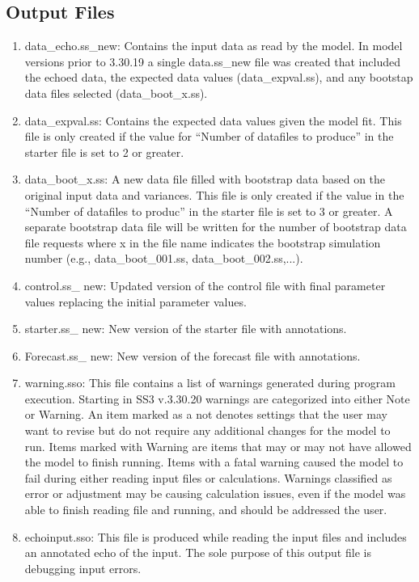	\subsection{Output Files}
	\begin{enumerate}
		\item data\_echo.ss\_new: Contains the input data as read by the model. In model versions prior to 3.30.19 a single data.ss\_new file was created that included the echoed data, the expected data values (data\_expval.ss), and any bootstap data files selected (data\_boot\_x.ss).
		\item data\_expval.ss: Contains the expected data values given the model fit. This file is only created if the value for ``Number of datafiles to produce'' in the starter file is set to 2 or greater.
		\item data\_boot\_x.ss: A new data file filled with bootstrap data based on the original input data and variances. This file is only created if the value in the ``Number of datafiles to produc'' in the starter file is set to 3 or greater. A separate bootstrap data file will be written for the number of bootstrap data file requests where x in the file name indicates the bootstrap simulation number (e.g., data\_boot\_001.ss, data\_boot\_002.ss,...).
		\item control.ss\_ new: Updated version of the control file with final parameter values replacing the initial parameter values.
		\item starter.ss\_ new: New version of the starter file with annotations.
		\item Forecast.ss\_ new: New version of the forecast file with annotations.
		\item warning.sso: This file contains a list of warnings generated during program execution. Starting in SS3 v.3.30.20 warnings are categorized into either Note or Warning. An item marked as a not denotes settings that the user may want to revise but do not require any additional changes for the model to run. Items marked with Warning are items that may or may not have allowed the model to finish running. Items with a fatal warning caused the model to fail during either reading input files or calculations. Warnings classified as error or adjustment may be causing calculation issues, even if the model was able to finish reading file and running, and should be addressed the user. 
		\item echoinput.sso: This file is produced while reading the input files and includes an annotated echo of the input. The sole purpose of this output file is debugging input errors.

\end{enumerate}
